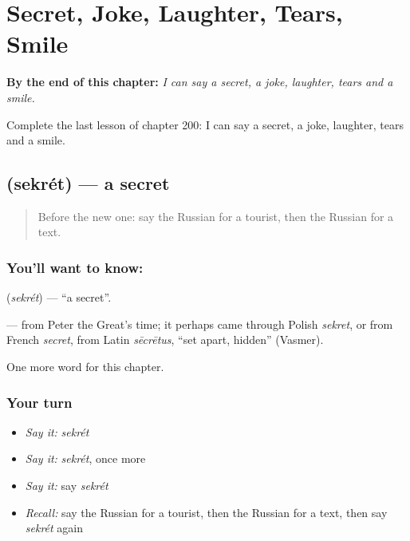 
\chapter{Secret, Joke, Laughter, Tears, Smile}
\label{ch:ru-secret-joke-laughter-tears-smile}

\begin{chapteropening}
\textbf{By the end of this chapter:} \emph{I can say a secret, a joke, laughter, tears and a smile.}

Complete the last lesson of chapter 200: I can say a secret, a joke, laughter, tears and a smile.
\end{chapteropening}

\section[\texorpdfstring{\ru{секрет} (sekrét)}{секрет (sekrét)}]{ (sekrét) — a secret}

\label{lesson:RU-C200-sekret}



\begin{quote}
Before the new one: say the Russian for a tourist, then the Russian for a text.
\end{quote}

\subsection*{You'll want to know: }
\textbf{} (\emph{sekrét}) — \textquotedblleft{}a secret\textquotedblright{}.

\begin{cousinweb}
\textbf{} — from Peter the Great's time; it perhaps came through Polish \emph{sekret}, or from French \emph{secret}, from Latin \emph{sēcrētus}, \textquotedblleft{}set apart, hidden\textquotedblright{} (Vasmer).
\end{cousinweb}

\begin{grammarlens}[title={What you've built}]
One more word for this chapter.
\end{grammarlens}

\subsection*{Your turn}
\begin{itemize}
\raggedright
  \item \emph{Say it:} \emph{sekrét}
  \item \emph{Say it:} \emph{sekrét}, once more
  \item \emph{Say it:} say \emph{sekrét}
  \item \emph{Recall:} say the Russian for a tourist, then the Russian for a text, then say \emph{sekrét} again
\end{itemize}

